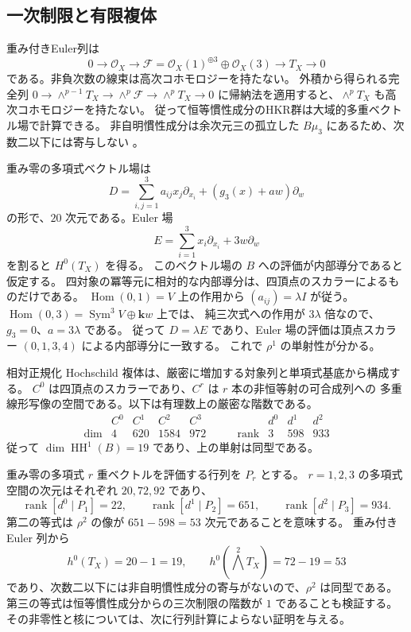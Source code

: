 \subsection{一次制限と有限複体}

重み付きEuler列は
\[
 0\longrightarrow\mathcal O_X\longrightarrow
 \mathcal F=\mathcal O_X(1)^{\oplus3}\oplus\mathcal O_X(3)
 \longrightarrow T_X\longrightarrow0
\]
である。非負次数の線束は高次コホモロジーを持たない。
外積から得られる完全列
$0\to\wedge^{p-1}T_X\to\wedge^p\mathcal F\to\wedge^pT_X\to0$
に帰納法を適用すると、$\wedge^pT_X$ も高次コホモロジーを持たない。
従って恒等慣性成分のHKR群は大域的多重ベクトル場で計算できる。
非自明慣性成分は余次元三の孤立した $B\mu_3$ にあるため、次数二以下には寄与しない
\cite[Corollary 1.4]{FPSS}。


重み零の多項式ベクトル場は
\[
 D=\sum_{i,j=1}^3 a_{ij}x_j\partial_{x_i}
       +(g_3(x)+a w)\partial_w
\]
の形で、$20$ 次元である。Euler 場
\[
 E=\sum_{i=1}^3x_i\partial_{x_i}+3w\partial_w
\]
を割ると $H^0(T_X)$ を得る。
このベクトル場の $B$ への評価が内部導分であると仮定する。
四対象の冪等元に相対的な内部導分は、四頂点のスカラーによるものだけである。
$\operatorname{Hom}(0,1)=V$ 上の作用から $(a_{ij})=\lambda I$ が従う。
$\operatorname{Hom}(0,3)=\operatorname{Sym}^3V\oplus\mathbf k w$ 上では、
純三次式への作用が $3\lambda$ 倍なので、$g_3=0$、$a=3\lambda$ である。
従って $D=\lambda E$ であり、Euler 場の評価は頂点スカラー
$(0,1,3,4)$ による内部導分に一致する。
これで $\rho^1$ の単射性が分かる。

相対正規化 Hochschild 複体は、厳密に増加する対象列と単項式基底から構成する。
$C^0$ は四頂点のスカラーであり、$C^r$ は $r$ 本の非恒等射の可合成列への
多重線形写像の空間である。以下は有理数上の厳密な階数である。
\[
\begin{array}{c|rrrr}
 &C^0&C^1&C^2&C^3\\\hline
\dim&4&620&1584&972
\end{array}
\qquad
\begin{array}{c|rrr}
 &d^0&d^1&d^2\\\hline
\operatorname{rank}&3&598&933
\end{array}
\]
従って $\dim\operatorname{HH}^1(B)=19$ であり、上の単射は同型である。

重み零の多項式 $r$ 重ベクトルを評価する行列を $P_r$ とする。
$r=1,2,3$ の多項式空間の次元はそれぞれ $20,72,92$ であり、
\[
 \operatorname{rank}[d^0\mid P_1]=22,\qquad
 \operatorname{rank}[d^1\mid P_2]=651,\qquad
 \operatorname{rank}[d^2\mid P_3]=934.
\]
第二の等式は $\rho^2$ の像が $651-598=53$ 次元であることを意味する。
重み付き Euler 列から
\[
 h^0(T_X)=20-1=19,\qquad
 h^0(\textstyle\bigwedge^2T_X)=72-19=53
\]
であり、次数二以下には非自明慣性成分の寄与がないので、$\rho^2$ は同型である。
第三の等式は恒等慣性成分からの三次制限の階数が $1$ であることも検証する。
その非零性と核については、次に行列計算によらない証明を与える。

